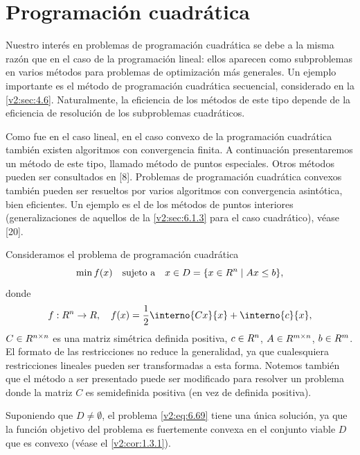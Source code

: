 
\section{Programación cuadrática}
\label{v2:sec:6.2}

Nuestro interés en problemas de programación cuadrática se debe a la misma razón que en el caso de la programación lineal: ellos aparecen como subproblemas en varios métodos para problemas de optimización más generales. Un ejemplo importante es el método de programación cuadrática secuencial, considerado en la \cref{v2:sec:4.6}. Naturalmente, la eficiencia de los métodos de este tipo depende de la eficiencia de resolución de los subproblemas cuadráticos.

Como fue en el caso lineal, en el caso convexo de la programación cuadrática también existen algoritmos con convergencia finita. A continuación presentaremos un método de este tipo, llamado método de puntos especiales. Otros métodos pueden ser consultados en [8]. Problemas de programación cuadrática convexos también pueden ser resueltos por varios algoritmos con convergencia asintótica, bien eficientes. Un ejemplo es el de los métodos de puntos interiores (generalizaciones de aquellos de la \cref{v2:sec:6.1.3} para el caso cuadrático), véase [20].

Consideramos el problema de programación cuadrática
\begin{equation}
    \min f(x) \quad \text{sujeto a} \quad x \in D = \{ x \in R^n \mid Ax \le b \},
    \label{v2:eq:6.69}
\end{equation}
donde
\[
    f : \Rn \to \R, \quad f(x) = \frac{1}{2} \interno{Cx}{x} + \interno{c}{x},
\]
$C \in R^{n \times n}$ es una matriz simétrica definida positiva, $c \in R^n$, $A \in R^{m \times n}$, $b \in R^m$. El formato de las restricciones no reduce la generalidad, ya que cualesquiera restricciones lineales pueden ser transformadas a esta forma. Notemos también que el método a ser presentado puede ser modificado para resolver un problema donde la matriz $C$ es semidefinida positiva (en vez de definida positiva).

Suponiendo que $D \neq \emptyset$, el problema \eqref{v2:eq:6.69} tiene una única solución, ya que la función objetivo del problema es fuertemente convexa en el conjunto viable $D$ que es convexo (véase el \cref{v2:cor:1.3.1}).

